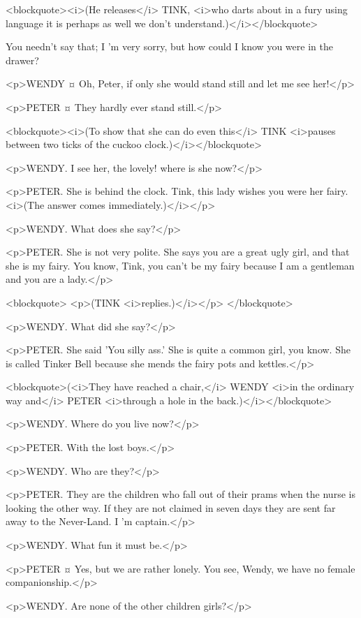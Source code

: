 <blockquote><i>(He releases</i> TINK, <i>who darts about in a fury using language it is perhaps as well we don't understand.)</i></blockquote>

You needn't say that; I 'm very sorry, but how could I know you were in the drawer? 

<p>WENDY ¤
Oh, Peter, if only she would stand still and let me see her!</p>

<p>PETER ¤
They hardly ever stand still.</p>

<blockquote><i>(To show that she can do even this</i> TINK <i>pauses between two ticks of the cuckoo clock.)</i></blockquote>

<p>WENDY. I see her, the lovely! where is she now?</p>

<p>PETER. She is behind the clock. Tink, this lady wishes you were her fairy. <i>(The answer comes immediately.)</i></p>

<p>WENDY. What does she say?</p>

<p>PETER. She is not very polite. She says you are a great ugly girl, and that she is my fairy. You know, Tink, you can't be my fairy because I am a gentleman and you are a lady.</p>

<blockquote> <p>(TINK <i>replies.)</i></p> </blockquote>

<p>WENDY. What did she say?</p>

<p>PETER. She said 'You silly ass.' She is quite a common girl, you know. She is called Tinker Bell because she mends the fairy pots and kettles.</p>

<blockquote>(<i>They have reached a chair,</i> WENDY <i>in the ordinary way and</i> PETER <i>through a hole in the back.)</i></blockquote>

<p>WENDY. Where do you live now?</p>

<p>PETER. With the lost boys.</p>

<p>WENDY. Who are they?</p>

<p>PETER. They are the children who fall out of their prams when the nurse is looking the other way. If they are not claimed in seven days they are sent far away to the Never-Land. I 'm captain.</p>

<p>WENDY. What fun it must be.</p>

<p>PETER ¤
Yes, but we are rather lonely. You see, Wendy, we have no female companionship.</p>

<p>WENDY. Are none of the other children girls?</p>

